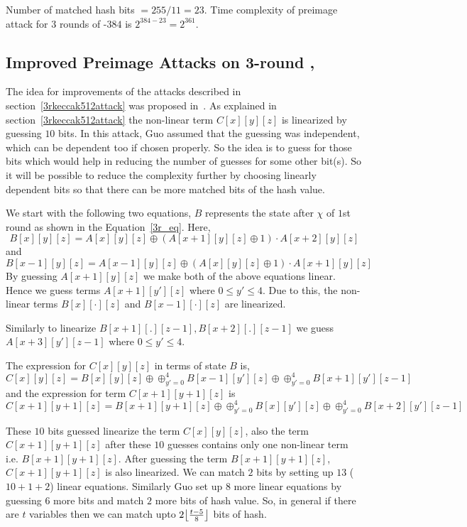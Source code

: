     Number of matched hash bits $ = 255/11 = 23 $. Time complexity of preimage attack for $3$ rounds of \KECCAK-$384$ is $ 2^{384 - 23} = 2^{361}$.

\subsection{Improved Preimage Attacks on 3-round , }
\label{improvedkeccak512}

    The idea for improvements of the attacks described in section~\ref{3rkeccak512attack} was proposed in~\cite{guo2016linear}. As explained in section~\ref{3rkeccak512attack} the non-linear term $C[x][y][z]$ is linearized by guessing $10$ bits. In this attack, Guo \etal assumed that the guessing was independent, which can be dependent too if chosen properly. So the idea is to guess for those bits which would help in reducing the number of guesses for some other bit(s). So it will be possible to reduce the complexity further by choosing linearly dependent bits so that there can be more matched bits of the hash value.

    We start with the following two equations, $B$ represents the state after $\chi$ of $1$st round as shown in the Equation~\ref{3r_eq}. Here,
        \[
            B[x][y][z] = A[x][y][z] \oplus (A[x+1][y][z] \oplus 1) \cdot A[x+2][y][z]
        \] and
        \[
            B[x-1][y][z] = A[x-1][y][z] \oplus (A[x][y][z] \oplus 1) \cdot A[x+1][y][z]
        \]
        By guessing $A[x+1][y][z]$ we make both of the above equations linear. Hence we guess terms $A[x+1][y'][z]$ where $0 \leq y' \leq 4$. Due to this, the non-linear terms $B[x][\cdot][z]$ and $B[x-1][\cdot][z]$ are linearized.
        
        Similarly to linearize $B[x+1][.][z-1], B[x+2][.][z-1]$ we guess $A[x+3][y'][z-1]$ where $0 \leq y' \leq 4$.
        
        The expression for $C[x][y][z]$ in terms of state $B$ is,        
        \[
        C[x][y][z] = B[x][y][z] \oplus \oplus_{y' = 0}^{4} B[x-1][y'][z] \oplus \oplus_{y' = 0}^{4} B[x+1][y'][z-1]
    \] and the expression for term $C[x+1][y+1][z]$ is 
        \[
        C[x+1][y+1][z] = B[x+1][y+1][z] \oplus \oplus_{y' = 0}^{4} B[x][y'][z] \oplus \oplus_{y' = 0}^{4} B[x+2][y'][z-1]
    \]
    
        These $10$ bits guessed linearize the term $C[x][y][z]$, also the term $C[x+1][y+1][z]$ after these $10$ guesses contains only one non-linear term i.e. $B[x+1][y+1][z]$. After guessing the term $B[x+1][y+1][z]$, $C[x+1][y+1][z]$ is also linearized. We can match $2$ bits by setting up $13$ ($10 + 1 + 2$) linear equations. Similarly Guo \etal set up $8$ more linear equations by guessing $6$ more bits and match $2$ more bits of hash value. So, in general if there are $t$ variables then we can match upto $ 2\floor*{\frac{t-5}{8}}$ bits of hash.

